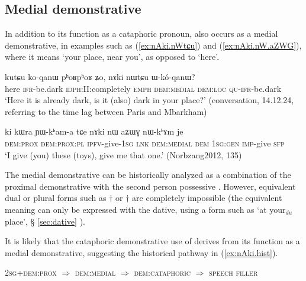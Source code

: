 \subsection{Medial demonstrative}
In addition to its function as a cataphoric pronoun,  also occurs as a medial demonstrative, in examples such as (\ref{ex:nAki.nWtɕu}) and (\ref{ex:nAki.nW.aZWG}), where it means `your place, near you', as opposed to `here'.

\begin{exe}
\ex \label{ex:nAki.nWtɕu}
\gll kutɕu ko-qanɯ pʰoʁpʰoʁ ʑo, nɤki nɯtɕu ɯ-kó-qanɯ? \\
here \textsc{ifr}-be.dark \textsc{idph}:II:completely \textsc{emph} \textsc{dem}:\textsc{medial} \textsc{dem}:\textsc{loc} \textsc{qu}-\textsc{ifr}-be.dark \\
\glt `Here it is already dark, is it (also) dark in your place?' (conversation, 14.12.24, referring to the time lag between Paris and Mbarkham)
\end{exe}

\begin{exe}
\ex \label{ex:nAki.nW.aZWG}
\gll  ki kɯra ɲɯ-kʰam-a tɕe nɤki nɯ aʑɯɣ nɯ-kʰɤm je \\
\textsc{dem}:\textsc{prox} \textsc{dem}:\textsc{prox}:\textsc{pl}  \textsc{ipfv}-give-\textsc{1sg} \textsc{lnk} \textsc{dem}:\textsc{medial} \textsc{dem} \textsc{1sg}:\textsc{gen} \textsc{imp}-give \textsc{sfp} \\
\glt `I give (you) these (toys), give me that one.'  (Norbzang2012, 135)
\end{exe}

The medial demonstrative  can be historically analyzed as a combination of the proximal demonstrative  with the second person possessive . However, equivalent dual or plural forms such as  $\dagger$ or $\dagger$ are completely impossible (the equivalent meaning can only be expressed with the dative, using a form such as  `at your$_{du}$ place', § \ref{sec:dative} ).


It is likely that the cataphoric demonstrative use of  derives  from its function as a medial demonstrative, suggesting the historical pathway in (\ref{ex:nAki.hist}).

\begin{exe}
\ex \label{ex:nAki.hist}
\glt \textsc{2sg}+\textsc{dem}:\textsc{prox} $\Rightarrow$ \textsc{dem}:\textsc{medial} $\Rightarrow$ \textsc{dem}:\textsc{cataphoric} $\Rightarrow$ \textsc{speech filler}
\end{exe}


